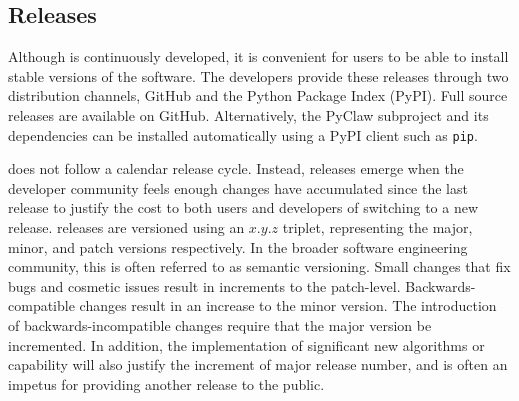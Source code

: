 \subsection{Releases}

Although \clawpack is continuously developed, it is convenient for
users to be able to install stable versions of the software.  The
\clawpack developers provide these releases through two distribution
channels, GitHub and the Python Package Index (PyPI).  Full source
releases are available on GitHub.  Alternatively, the PyClaw
subproject and its dependencies can be installed automatically using a
PyPI client such as \texttt{pip}.

\clawpack does not follow a calendar release cycle.  Instead, releases
emerge when the developer community feels enough changes have
accumulated since the last release to justify the cost to both users
and developers of switching to a new release.  \clawpack releases are
versioned using an $x.y.z$ triplet, representing the major, minor, and
patch versions respectively.  In the broader software engineering
community, this is often referred to as semantic versioning.  Small
changes that fix bugs and cosmetic issues result in increments to the
patch-level.  Backwards-compatible changes result in an increase to
the minor version.  The introduction of backwards-incompatible changes
require that the major version be incremented.  In addition, the
implementation of significant new algorithms or capability will also
justify the increment of major release number, and is often an impetus
for providing another release to the public.
